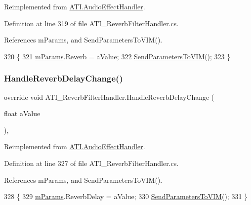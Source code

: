 Reimplemented from \hyperlink{class_a_t_i_1_1_audio_effect_handler_aee7aa84aa7d433a7f7264aff131d5a6a}{A\+T\+I.\+Audio\+Effect\+Handler}.



Definition at line 319 of file A\+T\+I\+\_\+\+Reverb\+Filter\+Handler.\+cs.



References m\+Params, and Send\+Parameters\+To\+V\+I\+M().


\begin{DoxyCode}
320     \{
321         \hyperlink{class_a_t_i___reverb_filter_handler_a034260fbce2052b42bceddc891632347}{mParams}.Reverb = aValue;
322         \hyperlink{class_a_t_i___reverb_filter_handler_aacb469dc3038fca616d638f6a5a04a30}{SendParametersToVIM}();
323     \}
\end{DoxyCode}
\mbox{\label{class_a_t_i___reverb_filter_handler_af126757d50b12330f868d2178bdb5d6c}} 
\subsubsection{\texorpdfstring{Handle\+Reverb\+Delay\+Change()}{HandleReverbDelayChange()}}
{\footnotesize\ttfamily override void A\+T\+I\+\_\+\+Reverb\+Filter\+Handler.\+Handle\+Reverb\+Delay\+Change (\begin{DoxyParamCaption}\item[{float}]{a\+Value }\end{DoxyParamCaption})\hspace{0.3cm}{\ttfamily [protected]}, {\ttfamily [virtual]}}



Reimplemented from \hyperlink{class_a_t_i_1_1_audio_effect_handler_a03f47bb2ac36fc9c672ccddd76af6e6a}{A\+T\+I.\+Audio\+Effect\+Handler}.



Definition at line 327 of file A\+T\+I\+\_\+\+Reverb\+Filter\+Handler.\+cs.



References m\+Params, and Send\+Parameters\+To\+V\+I\+M().


\begin{DoxyCode}
328     \{
329         \hyperlink{class_a_t_i___reverb_filter_handler_a034260fbce2052b42bceddc891632347}{mParams}.ReverbDelay = aValue;
330         \hyperlink{class_a_t_i___reverb_filter_handler_aacb469dc3038fca616d638f6a5a04a30}{SendParametersToVIM}();
331     \}
\end{DoxyCode}
\mbox{\label{class_a_t_i___reverb_filter_handler_a2100456086ad1adf704bf88d71dbe490}} 
